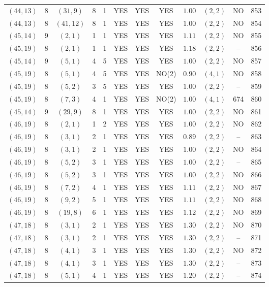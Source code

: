 \begin{longtable}{|c|c|c|c|c|c|c|c|c|c|c|c|}
$(44,13)$ & 8 & $(31,9)$ & 8 & 1 & YES & YES & YES & $1.00$ & $(2,2)$ & NO & 853\\
$(44,13)$ & 8 & $(41,12)$ & 8 & 1 & YES & YES & YES & $1.00$ & $(2,2)$ & NO & 854\\
$(45,14)$ & 9 & $(2,1)$ & 1 & 1 & YES & YES & YES & $1.11$ & $(2,2)$ & NO & 855\\
$(45,19)$ & 8 & $(2,1)$ & 1 & 1 & YES & YES & YES & $1.18$ & $(2,2)$ & -- & 856\\
$(45,14)$ & 9 & $(5,1)$ & 4 & 5 & YES & YES & YES & $1.00$ & $(2,2)$ & NO & 857\\
$(45,19)$ & 8 & $(5,1)$ & 4 & 5 & YES & YES & NO(2) & $0.90$ & $(4,1)$ & NO & 858\\
$(45,19)$ & 8 & $(5,2)$ & 3 & 5 & YES & YES & YES & $1.00$ & $(2,2)$ & -- & 859\\
$(45,19)$ & 8 & $(7,3)$ & 4 & 1 & YES & YES & NO(2) & $1.00$ & $(4,1)$ & 674 & 860\\
$(45,14)$ & 9 & $(29,9)$ & 8 & 1 & YES & YES & YES & $1.00$ & $(2,2)$ & NO & 861\\
$(46,19)$ & 8 & $(2,1)$ & 1 & 2 & YES & YES & YES & $1.00$ & $(2,2)$ & NO & 862\\
$(46,19)$ & 8 & $(3,1)$ & 2 & 1 & YES & YES & YES & $0.89$ & $(2,2)$ & -- & 863\\
$(46,19)$ & 8 & $(3,1)$ & 2 & 1 & YES & YES & YES & $1.00$ & $(2,2)$ & NO & 864\\
$(46,19)$ & 8 & $(5,2)$ & 3 & 1 & YES & YES & YES & $1.00$ & $(2,2)$ & -- & 865\\
$(46,19)$ & 8 & $(5,2)$ & 3 & 1 & YES & YES & YES & $1.00$ & $(2,2)$ & NO & 866\\
$(46,19)$ & 8 & $(7,2)$ & 4 & 1 & YES & YES & YES & $1.11$ & $(2,2)$ & NO & 867\\
$(46,19)$ & 8 & $(9,2)$ & 5 & 1 & YES & YES & YES & $1.11$ & $(2,2)$ & NO & 868\\
$(46,19)$ & 8 & $(19,8)$ & 6 & 1 & YES & YES & YES & $1.12$ & $(2,2)$ & NO & 869\\
$(47,18)$ & 8 & $(3,1)$ & 2 & 1 & YES & YES & YES & $1.30$ & $(2,2)$ & NO & 870\\
$(47,18)$ & 8 & $(3,1)$ & 2 & 1 & YES & YES & YES & $1.30$ & $(2,2)$ & -- & 871\\
$(47,18)$ & 8 & $(4,1)$ & 3 & 1 & YES & YES & YES & $1.30$ & $(2,2)$ & NO & 872\\
$(47,18)$ & 8 & $(4,1)$ & 3 & 1 & YES & YES & YES & $1.30$ & $(2,2)$ & -- & 873\\
$(47,18)$ & 8 & $(5,1)$ & 4 & 1 & YES & YES & YES & $1.20$ & $(2,2)$ & -- & 874\\

\end{longtable}
